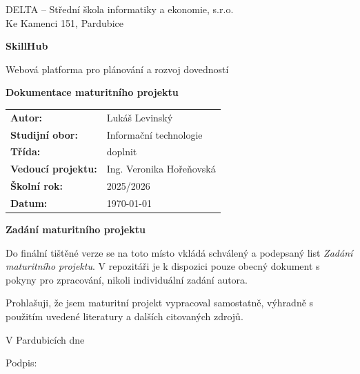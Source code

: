 \documentclass[12pt,a4paper]{report}
\newcommand{\studyField}{Informační technologie}
\newcommand{\className}{doplnit}
\begin{document}
\hypersetup{pageanchor=false}

\begin{titlepage}
\centering

{\large DELTA -- Střední škola informatiky a ekonomie, s.r.o.\\
Ke Kamenci 151, Pardubice\par}
\vspace{1.8cm}

{\Huge \textbf{SkillHub}\par}
\vspace{0.3cm}
{\Large Webová platforma pro plánování a rozvoj dovedností\par}
\vspace{0.6cm}
{\LARGE \textbf{Dokumentace maturitního projektu}\par}

\vspace{1.8cm}

\begin{tabular}{>{\bfseries}l l}
Autor: & Lukáš Levinský \\
Studijní obor: & \studyField \\
Třída: & \className \\
Vedoucí projektu: & Ing. Veronika Hořeňovská \\
Školní rok: & 2025/2026 \\
Datum: & \today \\
\end{tabular}

\end{titlepage}

\clearpage
\thispagestyle{empty}
\begin{center}
\textbf{Zadání maturitního projektu}
\end{center}
\vspace{1cm}
Do finální tištěné verze se na toto místo vkládá schválený a podepsaný list \textit{Zadání maturitního projektu}. V repozitáři je k dispozici pouze obecný dokument s pokyny pro zpracování, nikoli individuální zadání autora.

\clearpage
\thispagestyle{empty}
Prohlašuji, že jsem maturitní projekt vypracoval samostatně, výhradně s použitím uvedené literatury a dalších citovaných zdrojů.

\vspace{1.6cm}
V Pardubicích dne \dotfill

\vspace{1.6cm}
Podpis: \dotfill
\end{document}
